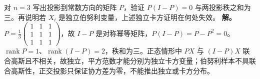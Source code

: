 \par
\begin{workedexample}
对 \(n=3\) 写出投影到常数方向的矩阵 \(P\)，验证 \(P(I-P)=0\) 与两投影秩之和为三。再说明若 \(X_i\) 是独立伯努利变量，上述独立卡方证明在何处失效。
\textbf{解。} \(P=\frac13\begin{pmatrix}1&1&1\\1&1&1\\1&1&1\end{pmatrix}\)，故 \(I-P\) 是对称幂等矩阵，\(P(I-P)=P-P^2=0\)。\(\operatorname{rank}P=1\)、\(\operatorname{rank}(I-P)=2\)，秩和为三。正态情形中 \(PX\) 与 \((I-P)X\) 联合高斯且不相关，故独立，平方范数才能分别为独立卡方变量；伯努利样本不具联合高斯性，正交投影只保证协方差为零，不能推出独立或卡方分布。
\end{workedexample}
\par
